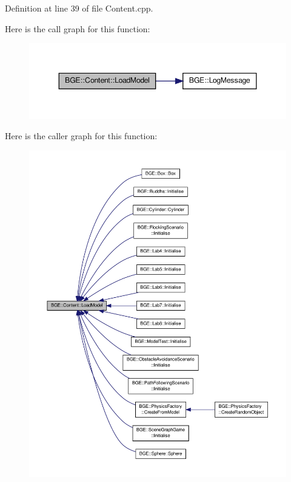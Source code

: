 Definition at line 39 of file Content.\-cpp.



Here is the call graph for this function\-:
\nopagebreak
\begin{figure}[H]
\begin{center}
\leavevmode
\includegraphics[width=348pt]{class_b_g_e_1_1_content_a593266376a259eacb7ebddfc71ee082a_cgraph}
\end{center}
\end{figure}




Here is the caller graph for this function\-:
\nopagebreak
\begin{figure}[H]
\begin{center}
\leavevmode
\includegraphics[width=350pt]{class_b_g_e_1_1_content_a593266376a259eacb7ebddfc71ee082a_icgraph}
\end{center}
\end{figure}


